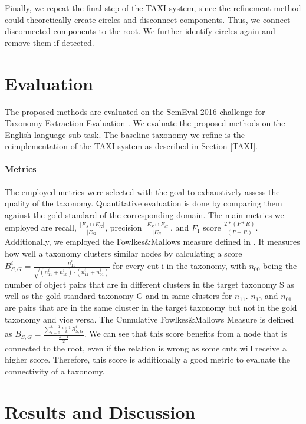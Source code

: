 \documentclass[12pt, headsepline, a4paper]{scrartcl}
\begin{document}
Finally, we repeat the final step of the TAXI system, since the refinement method could theoretically create circles and disconnect components. Thus, we connect disconnected components to the root. We further identify circles again and remove them if detected.


\section{Evaluation}

The proposed methods are evaluated on the SemEval-2016 challenge for Taxonomy Extraction Evaluation \cite{bordea2016semeval}. We evaluate the proposed methods on the English language sub-task.
The baseline taxonomy we refine is the reimplementation of the TAXI system as described in Section \ref{TAXI}.

\paragraph{Metrics} The employed metrics were selected with the goal to exhaustively assess the quality of the taxonomy. 
Quantitative evaluation is done by comparing them against the gold standard of the corresponding domain. The main metrics we employed are recall, $\frac{| E_S \cap{} E_G |}{| E_G |}$, precision $\frac{| E_S \cap{} E_G |}{| E_S |}$, and $F_{1}$ score $\frac{2 * ( P * R )} {( P + R )}$. Additionally, we employed the Fowlkes\&Mallows measure defined in \citep{velardi2013ontolearn, f&m}. It measures how well a taxonomy clusters similar nodes by calculating a score $B_{S,G}^i = \frac{n_{11}^i}{\sqrt{(n_{11}^i + n_{10}^i) \cdot (n_{11}^i + n_{01}^i)}}$ for every cut i in the taxonomy, with $n_{00}$ being the number of object pairs that are in different clusters in the target taxonomy S as well as the gold standard taxonomy G and in same clusters for $n_{11}$. $n_{10}$ and $n_{01}$ are pairs that are in the same cluster in the target taxonomy but not in the gold taxonomy and vice versa.
The Cumulative Fowlkes\&Mallows Measure is defined as $ B_{S,G} = \frac{\sum_{i = 0}^{k-1} \frac{i+1}{k} B_{S,G}^i}{\frac{k+1}{2}}$.	
We can see that this score benefits from a node that is connected to the root, even if the relation is wrong as some cuts will receive a higher score. Therefore, this score is additionally a good metric to evaluate the connectivity of a taxonomy.

\section{Results and Discussion}
\end{document}
